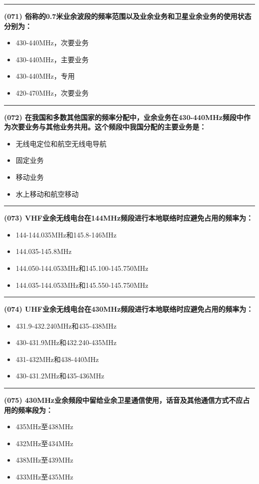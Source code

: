 \documentclass[twocolumn]{ctexart}  %
\begin{document}
\noindent\rule{0.5\textwidth}{1pt}
\heiti \textbf{(071) 俗称的0.7米业余波段的频率范围以及业余业务和卫星业余业务的使用状态分别为：} \songti {\color{gray} [LK0159] }
\begin{itemize}
	\item  430-440MHz，次要业务
	\item  430-440MHz，主要业务
	\item  430-440MHz，专用
	\item  420-470MHz，次要业务
\end{itemize}


\noindent\rule{0.5\textwidth}{1pt}
\heiti \textbf{(072) 在我国和多数其他国家的频率分配中，业余业务在430-440MHz频段中作为次要业务与其他业务共用。这个频段中我国分配的主要业务是：} \songti {\color{gray} [LK0160] }
\begin{itemize}
	\item  无线电定位和航空无线电导航
	\item  固定业务
	\item  移动业务
	\item  水上移动和航空移动
\end{itemize}


\noindent\rule{0.5\textwidth}{1pt}
\heiti \textbf{(073) VHF业余无线电台在144MHz频段进行本地联络时应避免占用的频率为：} \songti {\color{gray} [LK0171] }
\begin{itemize}
	\item  144-144.035MHz和145.8-146MHz
	\item  144.035-145.8MHz
	\item  144.050-144.053MHz和145.100-145.750MHz
	\item  144.035-144.053MHz和145.550-145.750MHz
\end{itemize}


\noindent\rule{0.5\textwidth}{1pt}
\heiti \textbf{(074) UHF业余无线电台在430MHz频段进行本地联络时应避免占用的频率为：} \songti {\color{gray} [LK0172] }
\begin{itemize}
	\item  431.9-432.240MHz和435-438MHz
	\item  430-431.9MHz和432.240-435MHz
	\item  431-432MHz和438-440MHz
	\item  430-431.2MHz和435-436MHz
\end{itemize}


\noindent\rule{0.5\textwidth}{1pt}
\heiti \textbf{(075) 430MHz业余频段中留给业余卫星通信使用，话音及其他通信方式不应占用的频率段为：} \songti {\color{gray} [LK1031] }
\begin{itemize}
	\item  435MHz至438MHz
	\item  432MHz至434MHz
	\item  438MHz至439MHz
	\item  433MHz至435MHz
\end{itemize}
\end{document}
